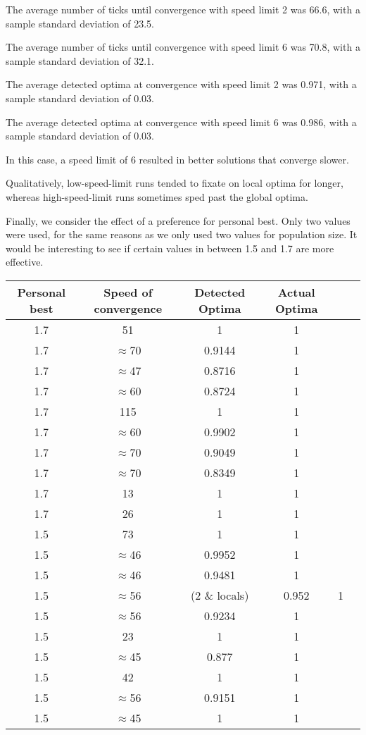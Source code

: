 \documentclass[12pt]{article}
\begin{document}
The average number of ticks until convergence with speed limit 2 was 66.6, with a sample standard deviation of 23.5.

The average number of ticks until convergence with speed limit 6 was 70.8, with a sample standard deviation of 32.1.

The average detected optima at convergence with speed limit 2 was 0.971, with a sample standard deviation of 0.03.

The average detected optima at convergence with speed limit 6 was 0.986, with a sample standard deviation of 0.03.

In this case, a speed limit of 6 resulted in better solutions that converge slower.

Qualitatively, low-speed-limit runs tended to fixate on local optima for longer, whereas high-speed-limit runs sometimes sped past the global optima.

Finally, we consider the effect of a preference for personal best. Only two values were used, for the same reasons as we only used two values for population size. It would be interesting to see if certain values in between 1.5 and 1.7 are more effective.

\begin{table}[h!]
\centering
\begin{tabular}{|c|c|c|c|c|c|}
\hline
\textbf{Personal best} & Speed of convergence & Detected Optima & Actual Optima \\ \hline
\hline
1.7 & 51 & 1 & 1 \\ \hline
1.7 & $\approx$70 & 0.9144 & 1 \\ \hline
1.7 & $\approx$47 & 0.8716 & 1 \\ \hline
1.7 & $\approx$60 & 0.8724 & 1 \\ \hline
1.7 & 115 & 1 & 1 \\ \hline
1.7 & $\approx$60 & 0.9902 & 1 \\ \hline
1.7 & $\approx$70 & 0.9049 & 1 \\ \hline
1.7 & $\approx$70 & 0.8349 & 1 \\ \hline
1.7 & 13 & 1 & 1 \\ \hline
1.7 & 26 & 1 & 1 \\ \hline
1.5 & 73 & 1 & 1 \\ \hline
1.5 & $\approx$46 & 0.9952 & 1 \\ \hline
1.5 & $\approx$46 & 0.9481 & 1 \\ \hline
1.5 & $\approx$56 & (2 \& locals) & 0.952 & 1 \\ \hline
1.5 & $\approx$56 & 0.9234 & 1 \\ \hline
1.5 & 23 & 1 & 1 \\ \hline
1.5 & $\approx$45 & 0.877 & 1 \\ \hline
1.5 & 42 & 1 & 1 \\ \hline
1.5 & $\approx$56 & 0.9151 & 1 \\ \hline
1.5 & $\approx$45 & 1 & 1 \\ \hline
\end{tabular}
\end{table}
\end{document}
